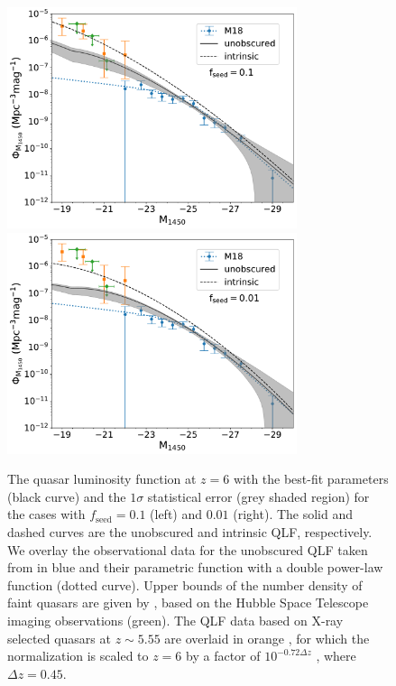 \documentclass[twocolumn, twocolappendix]{aastex63}
\newcommand{\fseed}{f_\mathrm{seed}}
\begin{document}
\begin{CJK*}{UTF8}{gbsn}
\begin{figure}
\centering
\includegraphics[width=85mm]{f1ndraw60LF_spread.pdf}\hspace{3mm}
\includegraphics[width=85mm]{f2ndraw60LF_spread.pdf}
\caption{
The quasar luminosity function at $z=6$ with the best-fit parameters (black curve) and the $1\sigma$ statistical error (grey shaded region) 
for the cases with $\fseed=0.1$ (left) and $0.01$ (right).
The solid and dashed curves are the unobscured and intrinsic QLF, respectively.
We overlay the observational data for the unobscured QLF taken from  in blue and their parametric function with a double power-law function (dotted curve).
Upper bounds of the number density of faint quasars are given by \citet{2022NatAs...6..850J}, based on the Hubble Space Telescope imaging observations (green).
The QLF data based on X-ray selected quasars at $z\sim 5.55$ are overlaid in orange \citep{2019ApJ...884...19G}, for which the normalization is scaled to $z=6$
by a factor of $10^{-0.72\Delta z}$ \citep{2016ApJ...833..222J}, where $\Delta z=0.45$.
}
\label{fig:fitlf}
\vspace{5mm}
\end{figure}



\end{CJK*}
\end{document}
